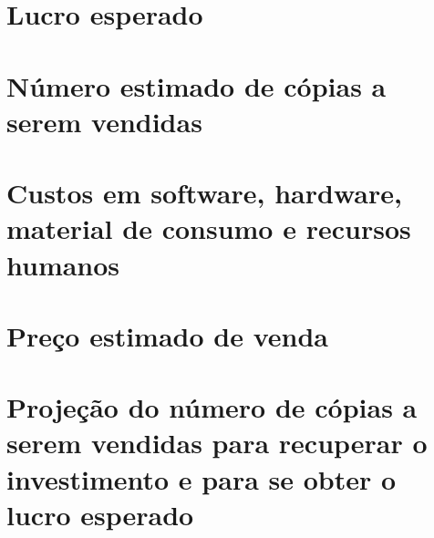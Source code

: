 \documentclass[a4paper,11pt]{article}
\begin{document}
\section{Lucro esperado}

\section{Número estimado de cópias a serem vendidas}

\section{Custos em software, hardware, material de consumo e recursos humanos}

\section{Preço estimado de venda}

\section{Projeção do número de cópias a serem vendidas para recuperar o
	    investimento e para se obter o lucro esperado}
\end{document}
